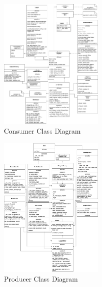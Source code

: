 \begin{figure}[htbp]
	\centerline{\includegraphics[width=0.45\textwidth]{resources/chapter-4/consumer-class_diagram.png}}
	\caption{Consumer Class Diagram}
	\label{fig-section-4-consumer-class-diagram}
\end{figure}

\begin{figure}[htbp]
	\centerline{\includegraphics[width=0.45\textwidth]{resources/chapter-4/producer-class_diagram.png}}
	\caption{Producer Class Diagram}
	\label{fig-section-4-producer-class-diagram}
\end{figure}